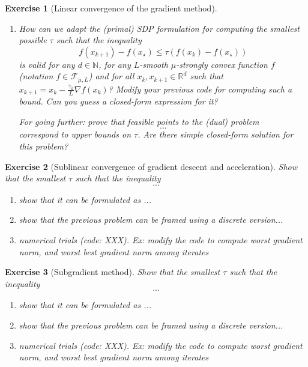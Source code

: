 \documentclass[11pt,a4paper]{article}
\newtheorem{exercise}{Exercise}
\begin{document}
\begin{exercise}[Linear convergence of the gradient method]
\begin{enumerate}
	For going further: prove that feasible points to the (dual) problem
	\begin{equation*}
	...
	\end{equation*}
	correspond to upper bounds on $\tau$. Are there simple closed-form solution for this problem?
	\item How can we adapt the (primal) SDP formulation for computing the smallest possible $\tau$ such that the inequality
	\[ f(x_{k+1})-f(x_\star) \leqslant \tau (f(x_{k})-f(x_\star))\]
	is valid for any $d\in\mathbb{N}$, for any $L$-smooth $\mu$-strongly convex function $f$ (notation $f\in\mathcal{F}_{\mu,L}$) and for all $x_k,x_{k+1}\in\mathbb{R}^d$ such that $x_{k+1}=x_k-\frac{\gamma_k}{L} \nabla f(x_k)$? Modify your previous code for computing such a bound. Can you guess a closed-form expression for it?
	
	For going further: prove that feasible points to the (dual) problem
	\begin{equation*}
	...
	\end{equation*}
	correspond to upper bounds on $\tau$. Are there simple closed-form solution for this problem?
	\end{enumerate}
	\end{exercise}

	\begin{exercise}[Sublinear convergence of gradient descent and acceleration]
	Show that the smallest $\tau$ such that the inequality
	\[ ... \]
	\begin{enumerate}
	\item show that it can be formulated as ...
	\item show that the previous problem can be framed using a discrete version...
	\item numerical trials (code: XXX). Ex: modify the code to compute worst gradient norm, and worst best gradient norm among iterates
	\end{enumerate}
	\end{exercise}
	
\begin{exercise}[Subgradient method]
	Show that the smallest $\tau$ such that the inequality
	\[ ... \]
	\begin{enumerate}
	\item show that it can be formulated as ...
	\item show that the previous problem can be framed using a discrete version...
	\item numerical trials (code: XXX). Ex: modify the code to compute worst gradient norm, and worst best gradient norm among iterates
	\end{enumerate}
	\end{exercise}
	
\end{document}
